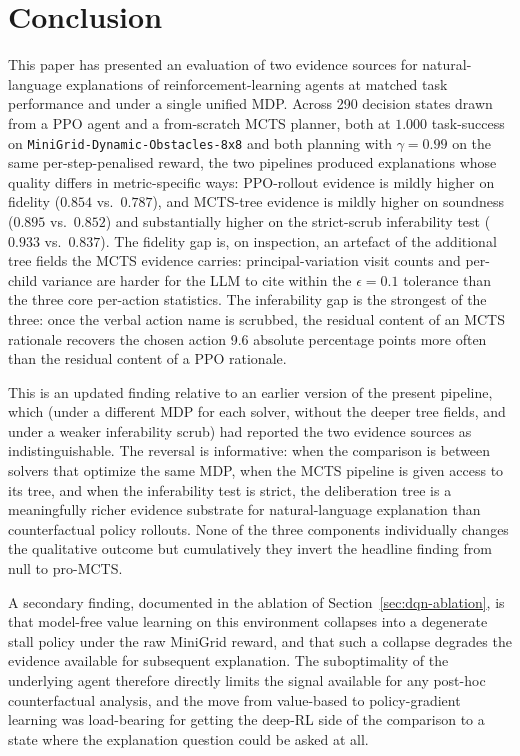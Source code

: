 \documentclass[conference]{IEEEtran}
\begin{document}
\section{Conclusion}
This paper has presented an evaluation of two evidence sources for
natural-language explanations of reinforcement-learning agents at
matched task performance and under a single unified MDP. Across 290
decision states drawn from a PPO agent and a from-scratch MCTS
planner, both at $1.000$ task-success on
\texttt{MiniGrid-Dynamic-Obstacles-8x8} and both planning with
$\gamma = 0.99$ on the same per-step-penalised reward, the two
pipelines produced explanations whose quality differs in
metric-specific ways: PPO-rollout evidence is mildly higher on
fidelity ($0.854$ vs.\ $0.787$), and MCTS-tree evidence is mildly
higher on soundness ($0.895$ vs.\ $0.852$) and substantially higher
on the strict-scrub inferability test ($0.933$ vs.\ $0.837$). The
fidelity gap is, on inspection, an artefact of the additional tree
fields the MCTS evidence carries: principal-variation visit counts
and per-child variance are harder for the LLM to cite within the
$\epsilon = 0.1$ tolerance than the three core per-action statistics.
The inferability gap is the strongest of the three: once the verbal
action name is scrubbed, the residual content of an MCTS rationale
recovers the chosen action 9.6 absolute percentage points more often
than the residual content of a PPO rationale.

This is an updated finding relative to an earlier version of the
present pipeline, which (under a different MDP for each solver,
without the deeper tree fields, and under a weaker inferability
scrub) had reported the two evidence sources as
indistinguishable. The reversal is informative: when the comparison
is between solvers that optimize the same MDP, when the MCTS pipeline
is given access to its tree, and when the inferability test is
strict, the deliberation tree is a meaningfully richer evidence
substrate for natural-language explanation than counterfactual
policy rollouts. None of the three components individually changes
the qualitative outcome but cumulatively they invert the headline
finding from null to pro-MCTS.

A secondary finding, documented in the ablation of
Section~\ref{sec:dqn-ablation}, is that model-free value learning on
this environment collapses into a degenerate stall policy under the
raw MiniGrid reward, and that such a collapse degrades the evidence
available for subsequent explanation. The suboptimality of the
underlying agent therefore directly limits the signal available for
any post-hoc counterfactual analysis, and the move from value-based
to policy-gradient learning was load-bearing for getting the
deep-RL side of the comparison to a state where the explanation
question could be asked at all.
\end{document}
